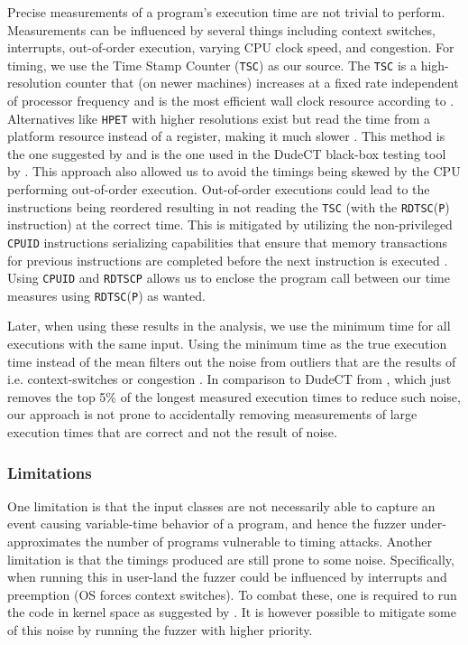 Precise measurements of a program's execution time are not trivial to perform. 
Measurements can be influenced by several things including context switches, interrupts, out-of-order execution, varying CPU clock speed, and congestion. 
For timing, we use the Time Stamp Counter (\texttt{TSC}) as our source.
The \texttt{TSC} is a high-resolution counter that (on newer machines) increases at a fixed rate independent of processor frequency and is the most efficient wall clock resource according to \citep[b]{intel-reference}.
Alternatives like \texttt{HPET} with higher resolutions exist but read the time from a platform resource instead of a register, making it much slower \citep[b]{intel-reference}.
This method is the one suggested by \citep{intel-benchmark-code-execution} and is the one used in the DudeCT black-box testing tool by \citep{dudect}.
This approach also allowed us to avoid the timings being skewed by the CPU performing out-of-order execution.
Out-of-order executions could lead to the instructions being reordered resulting in not reading the \texttt{TSC} (with the \texttt{RDTSC}(\texttt{P}) instruction) at the correct time. 
This is mitigated by utilizing the non-privileged \texttt{CPUID} instructions serializing capabilities that ensure that memory transactions for previous instructions are completed before the next instruction is executed \citep[a]{intel-reference}.
Using \texttt{CPUID} and \texttt{RDTSCP} allows us to enclose the program call between our time measures using \texttt{RDTSC}(\texttt{P}) as wanted.



Later, when using these results in the analysis, we use the minimum time for all executions with the same input.
Using the minimum time as the true execution time instead of the mean filters out the noise from outliers that are the results of i.e. context-switches or congestion \citep{robust-benchmarking}. 
In comparison to DudeCT from \citep{dudect}, which just removes the top 5\% of the longest measured execution times to reduce such noise, our approach is not prone to accidentally removing measurements of large execution times that are correct and not the result of noise.

\subsubsection{Limitations}
One limitation is that the input classes are not necessarily able to capture an event causing variable-time behavior of a program, and hence the fuzzer under-approximates the number of programs vulnerable to timing attacks.
Another limitation is that the timings produced are still prone to some noise.
Specifically, when running this in user-land the fuzzer could be influenced by interrupts and preemption (OS forces context switches). 
To combat these, one is required to run the code in kernel space as suggested by \citep{intel-benchmark-code-execution}.
It is however possible to mitigate some of this noise by running the fuzzer with higher priority. 
